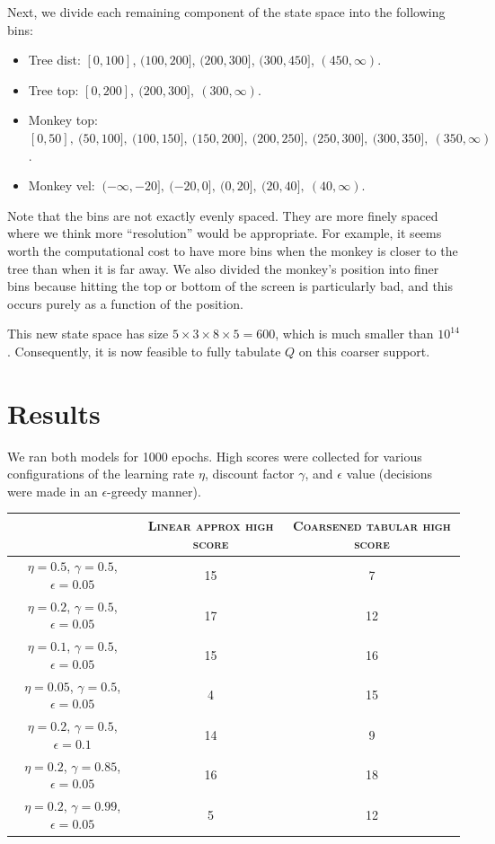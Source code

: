 \documentclass[11pt]{article}
\begin{document}
Next, we divide each remaining component of the state space into the following bins:
\begin{itemize}
    \item Tree dist: $[0,100]$, $(100,200]$, $(200, 300]$, $(300, 450]$, $(450, \infty)$.
    \item Tree top: $[0,200], \ (200, 300], \ (300, \infty)$.
    \item Monkey top: $[0,50], \ (50, 100], \ (100, 150], \ (150, 200], \ (200, 250], \ (250, 300], \ (300, 350], \ (350, \infty)$.
    \item Monkey vel: $\ (-\infty, -20], \ (-20, 0], \ (0, 20], \ (20, 40], \ (40, \infty)$.
\end{itemize}
Note that the bins are not exactly evenly spaced. They are more finely spaced where we think more ``resolution'' would be appropriate. For example, it seems  worth the computational cost to have more bins when the monkey is closer to the tree than when it is far away. We also divided the monkey's position into finer bins because hitting the top or bottom of the screen is particularly bad, and this occurs purely as a function of the position.

This new state space has size $5 \times 3 \times 8 \times 5 = 600$, which is much smaller than $10^{14}$. Consequently, it is now feasible to fully tabulate $Q$ on this coarser support. 


\section{Results}
We ran both models for 1000 epochs. High scores were collected for various configurations of the learning rate $\eta$, discount factor $\gamma$, and $\epsilon$ value (decisions were made in an $\epsilon$-greedy manner).
\begin{table}[!h]
    \centering
    \begin{tabular}{c|c|c}
     \toprule
      & \textsc{Linear approx high score} & \textsc{Coarsened tabular high score}  \\
     \hline
     $\eta=0.5$, $\gamma=0.5$, $\epsilon=0.05$ & 15 & 7 \\
     $\eta=0.2$, $\gamma=0.5$, $\epsilon=0.05$ & 17 & 12 \\
     $\eta=0.1$, $\gamma=0.5$, $\epsilon=0.05$ & 15 & 16 \\
     $\eta=0.05$, $\gamma=0.5$, $\epsilon=0.05$ & 4 & 15 \\
     $\eta=0.2$, $\gamma=0.5$, $\epsilon=0.1$ & 14 & 9 \\
     $\eta=0.2$, $\gamma=0.85$, $\epsilon=0.05$ & 16 & 18 \\
     $\eta=0.2$, $\gamma=0.99$, $\epsilon=0.05$ & 5 & 12 \\
     \bottomrule
    \end{tabular}
\end{table}
\end{document}
